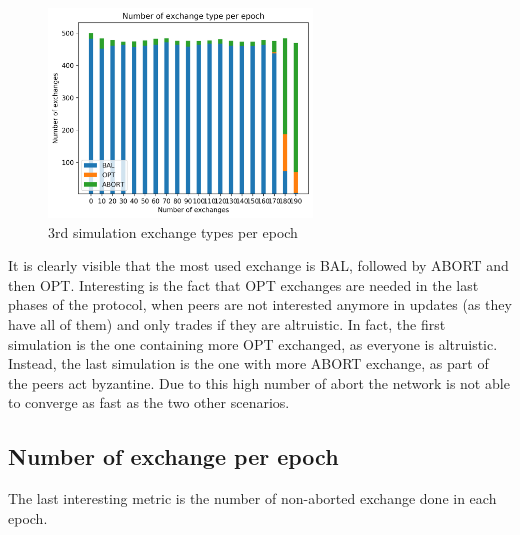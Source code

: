 \documentclass[mscthesis]{usiinfthesis}
\begin{document}
\begin{figure}[H]
  \centering
  \includegraphics[width=7cm]{images/3/3-types.png}
  \caption{3rd simulation exchange types per epoch }
  \label{fig:sim-three-duplicates}
\end{figure}

It is clearly visible that the most used exchange is BAL, followed by ABORT and then OPT. Interesting is the fact that OPT exchanges are needed in the last phases of the protocol, when peers are not interested anymore in updates (as they have all of them) and only trades if they are altruistic.
In fact, the first simulation is the one containing more OPT exchanged, as everyone is altruistic. \\
Instead, the last simulation is the one with more ABORT exchange, as part of the peers act byzantine. Due to this high number of abort the network is not able to converge as fast as the two other scenarios.

\subsection{Number of exchange per epoch}
The last interesting metric is the number of non-aborted exchange done in each epoch.
\end{document}
